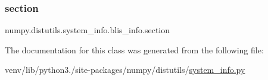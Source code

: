 \subsubsection{\texorpdfstring{section}{section}}
{\footnotesize\ttfamily numpy.\+distutils.\+system\+\_\+info.\+blis\+\_\+info.\+section\hspace{0.3cm}{\ttfamily [static]}}



The documentation for this class was generated from the following file\+:\begin{DoxyCompactItemize}
\item 
venv/lib/python3./site-\/packages/numpy/distutils/\hyperlink{system__info_8py}{system\+\_\+info.\+py}\end{DoxyCompactItemize}
